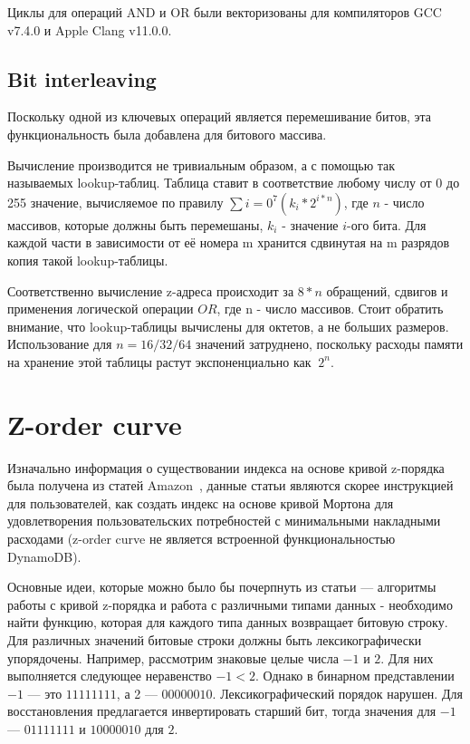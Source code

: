Циклы для операций AND и OR были векторизованы для компиляторов
GCC v7.4.0 и Apple Clang v11.0.0.

\subsection{Bit interleaving}
Поскольку одной из ключевых операций является перемешивание битов, эта функциональность была добавлена для битового массива.

Вычисление производится не тривиальным образом, а с помощью так называемых lookup-таблиц. Таблица ставит в соответствие любому числу от 0 до 255 значение, вычисляемое по правилу $\sum{i=0}^7(k_i * 2^{i*n})$, где $n$ - число массивов, которые должны быть перемешаны, $k_i$ - значение $i$-ого бита. Для каждой части в зависимости от её номера m хранится сдвинутая на m разрядов копия такой lookup-таблицы.

Соответственно вычисление z-адреса происходит за $8*n$ обращений, сдвигов и применения логической операции $OR$, где n - число массивов. Стоит обратить внимание, что lookup-таблицы вычислены для октетов, а не больших размеров. Использование для $n=16/32/64$ значений затруднено, поскольку расходы памяти на хранение этой таблицы растут экспоненциально как $~2^n$.


\section{Z-order curve}
\label{zordercurvesection}
Изначально информация о существовании индекса на основе кривой z-порядка была получена из статей Amazon~\cite{DynamoZorderP1, DynamoZorderP2}, данные статьи являются скорее инструкцией для пользователей, как создать индекс на основе кривой Мортона для удовлетворения пользовательских потребностей с минимальными накладными расходами (z-order curve не является встроенной функциональностью DynamoDB).

Основные идеи, которые можно было бы почерпнуть из статьи --- алгоритмы работы с кривой z-порядка и работа с различными типами данных - необходимо найти функцию, которая для каждого типа данных возвращает битовую строку. Для различных значений битовые строки должны быть лексикографически упорядочены. Например, рассмотрим знаковые целые числа $-1$ и $2$. Для них выполняется следующее неравенство $-1 < 2$. Однако в бинарном представлении $-1$ --- это $11111111$, а 2 --- $00000010$. Лексикографический порядок нарушен. Для восстановления предлагается инвертировать старший бит, тогда значения для $-1$ --- $01111111$ и $10000010$ для $2$.

